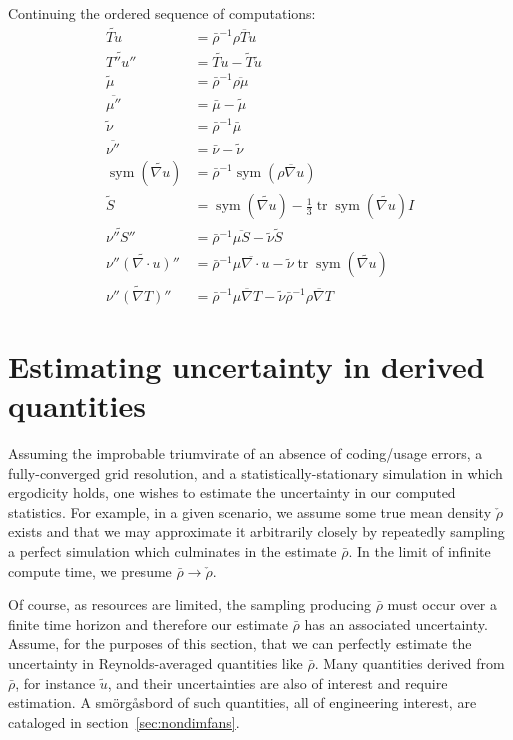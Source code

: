 \documentclass[letterpaper,11pt,nointlimits,reqno,draft]{amsbook}
\newcommand{\symmetricpart}[1]
  {\ensuremath{\operatorname{sym}\left(#1\right)}}
\DeclareMathOperator{\trace}{tr}
\begin{document}
Continuing the ordered sequence of computations:
{ \allowdisplaybreaks[1]
\begin{align}
  \widetilde{Tu} &= \bar{\rho}^{-1} \overline{\rho{}Tu}
\\
  \widetilde{T''u''} &= \widetilde{Tu} - \tilde{T}\tilde{u}
\\
  \tilde{\mu} &= \bar{\rho}^{-1} \overline{\rho\mu}
\\
  \overline{\mu''} &= \bar{\mu} - \tilde{\mu}
\\
  \tilde{\nu} &= \bar{\rho}^{-1} \bar{\mu}
\\
  \overline{\nu''} &= \bar{\nu} - \tilde{\nu}
\\
  \symmetricpart{\widetilde{\nabla{}u}}
  &= \bar{\rho}^{-1} \symmetricpart{\overline{\rho\nabla{}u}}
\\
  \tilde{S} &= \symmetricpart{\widetilde{\nabla{}u}}
   - \frac{1}{3} \trace\symmetricpart{\widetilde{\nabla{}u}} I
\\
  \widetilde{\nu''S''}
  &= \bar{\rho}^{-1} \overline{\mu{}S} - \tilde{\nu}\tilde{S}
\\
  \widetilde{\nu''\left(\nabla\cdot{}u\right)''}
  &= \bar{\rho}^{-1} \overline{\mu\nabla\cdot{}u}
   - \tilde{\nu}\trace\symmetricpart{\widetilde{\nabla{}u}}
\\
  \widetilde{\nu''\left(\nabla{}T\right)''}
  &= \bar{\rho}^{-1} \overline{\mu\nabla{}T}
   - \tilde{\nu} \bar{\rho}^{-1} \overline{\rho\nabla{}T}
\end{align}
}

\section{Estimating uncertainty in derived quantities}

Assuming the improbable triumvirate of an absence of coding/usage errors, a
fully-converged grid resolution, and a statistically-stationary simulation in
which ergodicity holds, one wishes to estimate the uncertainty in our computed
statistics.  For example, in a given scenario, we assume some true mean density
$\check{\rho}$ exists and that we may approximate it arbitrarily closely by
repeatedly sampling a perfect simulation which culminates in the estimate
$\bar{\rho}$.   In the limit of infinite compute time, we presume
$\bar{\rho}\to\check{\rho}$.

Of course, as resources are limited, the sampling producing $\bar{\rho}$ must
occur over a finite time horizon and therefore our estimate $\bar{\rho}$ has an
associated uncertainty.  Assume, for the purposes of this section, that we can
perfectly estimate the uncertainty in Reynolds-averaged quantities like
$\bar{\rho}$.  Many quantities derived from $\bar{\rho}$, for instance
$\tilde{u}$, and their uncertainties are also of interest and require
estimation.  A sm\"{o}rg\r{a}sbord of such quantities, all of engineering
interest, are cataloged in section~\ref{sec:nondimfans}.
\end{document}

